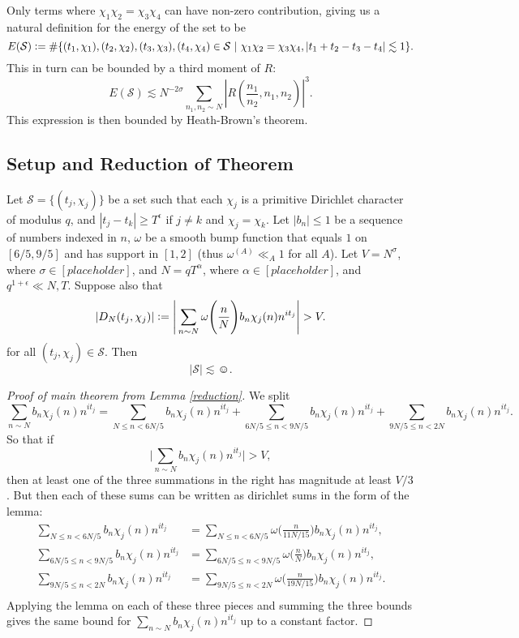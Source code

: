 Only terms where $\chi_1\chi_2=\chi_3\chi_4$ can have non-zero contribution, giving us a natural definition for the energy of the set to be \[
E(\mathcal{S})\defeq \#\{(t_1,\chi_1),(t_2,\chi_2),(t_3,\chi_3),(t_4,\chi_4)\in \mathcal{S} \ | \ \chi_1\chi_2=\chi_3\chi_4, |t_1+t_2-t_3-t_4|\lesssim 1\}.
\]
This in turn can be bounded by a third moment of $R$: \[
 E(\mathcal{S})\lesssim N^{-2\sigma}\sum_{n_1,n_2\sim N}\left|R\left(\frac{n_1}{n_2},n_1,n_2\right) \right|^3.\]
 This expression is then bounded by Heath-Brown's theorem.

\subsection{Setup and Reduction of Theorem}
\begin{lemma}\label{reduction}
    Let $\mathcal{S}=\{(t_j,\chi_j)\}$ be a set such that each $\chi_j$ is a primitive Dirichlet character of modulus $q$, and $|t_j-t_k|\geq T^\epsilon$ if $j\neq k$ and $\chi_j=\chi_k$. Let $|b_n|\leq 1$ be a sequence of numbers indexed in $n$, $\omega$ be a smooth bump function that equals $1$ on $[6/5,9/5]$ and has support in $[1,2]$ (thus $\omega^{(A)}\ll_A 1$ for all $A$). Let $V=N^\sigma$, where $\sigma \in [placeholder]$, and $N=qT^\alpha$, where $\alpha \in [placeholder]$, and $q^{1+\epsilon}\ll N,T$. Suppose also that \[
    |D_N(t_j,\chi_j)|\defeq\Bigg|\sum_{n\sim N} \omega\Bigg(\frac{n}{N}\Bigg)b_n\chi_j(n)n^{it_j} \Bigg|>V.
\]
for all $(t_j,\chi_j)\in\mathcal{S}$.
Then \[
|\mathcal{S}|\lesssim \smiley.
\]
\end{lemma}
\begin{proof}[Proof of main theorem from Lemma \ref{reduction}]
    We split \[
        \sum_{n\sim N} b_n\chi_j(n)n^{it_j}=\sum_{N\leq n< 6N/5} b_n\chi_j(n)n^{it_j} +\sum_{6N/5 \leq n < 9N/5} b_n\chi_j(n)n^{it_j} +\sum_{9N/5 \leq n < 2N} b_n\chi_j(n)n^{it_j}.
    \]
    So that if \[
        \Big|\sum_{n\sim N} b_n\chi_j(n)n^{it_j}\Big|>V,
    \]
    then at least one of the three summations in the right has magnitude at least $V/3$.
    But then each of these sums can be written as dirichlet sums in the form of the lemma: \begin{align*}
        \sum_{N\leq n< 6N/5} b_n\chi_j(n)n^{it_j} &=  \sum_{N\leq n< 6N/5} \omega\Bigg(\frac{n}{11N/15}\Bigg) b_n\chi_j(n)n^{it_j}, \\
        \sum_{6N/5 \leq n < 9N/5} b_n\chi_j(n)n^{it_j} &=  \sum_{6N/5 \leq n < 9N/5} \omega\Bigg(\frac{n}{N}\Bigg) b_n\chi_j(n)n^{it_j}, \\
        \sum_{9N/5 \leq n < 2N}  b_n\chi_j(n)n^{it_j} &=  \sum_{9N/5 \leq n < 2N}  \omega\Bigg(\frac{n}{19N/15}\Bigg) b_n\chi_j(n)n^{it_j}. \\
    \end{align*}
    Applying the lemma on each of these three pieces and summing the three bounds gives the same bound for $\sum_{n\sim N} b_n\chi_j(n)n^{it_j}$ up to a constant factor.
\end{proof}
